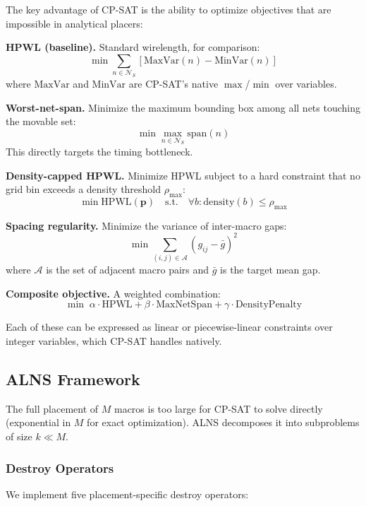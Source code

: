 \documentclass[sigconf,anonymous,review,9pt]{acmart}
\begin{document}
The key advantage of CP-SAT is the ability to optimize objectives that are impossible in analytical placers:

\textbf{HPWL (baseline).} Standard wirelength, for comparison:
\begin{equation}
\min \sum_{n \in \mathcal{N}_S} \left[\text{MaxVar}(n) - \text{MinVar}(n)\right]
\end{equation}
where $\text{MaxVar}$ and $\text{MinVar}$ are CP-SAT's native $\max$/$\min$ over variables.

\textbf{Worst-net-span.} Minimize the maximum bounding box among all nets touching the movable set:
\begin{equation}
\min \max_{n \in \mathcal{N}_S} \text{span}(n)
\end{equation}
This directly targets the timing bottleneck.

\textbf{Density-capped HPWL.} Minimize HPWL subject to a hard constraint that no grid bin exceeds a density threshold $\rho_{\max}$:
\begin{equation}
\min \text{HPWL}(\mathbf{p}) \quad \text{s.t.} \quad \forall b: \text{density}(b) \leq \rho_{\max}
\end{equation}

\textbf{Spacing regularity.} Minimize the variance of inter-macro gaps:
\begin{equation}
\min \sum_{(i,j) \in \mathcal{A}} (g_{ij} - \bar{g})^2
\end{equation}
where $\mathcal{A}$ is the set of adjacent macro pairs and $\bar{g}$ is the target mean gap.

\textbf{Composite objective.} A weighted combination:
\begin{equation}
\min \; \alpha \cdot \text{HPWL} + \beta \cdot \text{MaxNetSpan} + \gamma \cdot \text{DensityPenalty}
\end{equation}

Each of these can be expressed as linear or piecewise-linear constraints over integer variables, which CP-SAT handles natively.

\subsection{ALNS Framework}
\label{subsec:alns}

The full placement of $M$ macros is too large for CP-SAT to solve directly (exponential in $M$ for exact optimization). ALNS decomposes it into subproblems of size $k \ll M$.

\subsubsection{Destroy Operators}
We implement five placement-specific destroy operators:
\end{document}
